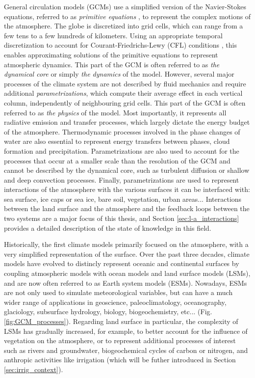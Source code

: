 General circulation models (GCMs) use a simplified version of the Navier-Stokes equations, referred to as \textit{primitive equations} \citep[initially formulated in ][]{bjerknes1910}, to represent the complex motions of the atmosphere. 
The globe is discretized into grid cells, which can range from a few tens to a few hundreds of kilometers. Using an appropriate temporal discretization to account for Courant-Friedrichs-Lewy (CFL) conditions \citep{courant_partial_1967}, this enables approximating solutions of the primitive equations to represent atmospheric dynamics. This part of the GCM is often referred to as \textit{the dynamical core} or simply \textit{the dynamics} of the model. 
However, several major processes of the climate system are not described by fluid mechanics and require additional \textit{parametrizations}, which compute their average effect in each vertical column, independently of neighbouring grid cells. 
This part of the GCM is often referred to as \textit{the physics} of the model.
Most importantly, it represents all radiative emission and transfer processes, which largely dictate the energy budget of the atmosphere.
Thermodynamic processes involved in the phase changes of water are also essential to represent energy transfers between phases, cloud formation and precipitation. Parametrizations are also used to account for the processes that occur at a smaller scale than the resolution of the GCM and cannot be described by the dynamical core, such as turbulent diffusion or shallow and deep convection processes. Finally, parametrizations are used to represent interactions of the atmosphere with the various surfaces it can be interfaced with: sea surface, ice caps or sea ice, bare soil, vegetation, urban areas... 
Interactions between the land surface and the atmosphere and the feedback loops between the two systems are a major focus of this thesis, and Section \ref{sec:l-a_interactions} provides a detailed description of the state of knowledge in this field. 

Historically, the first climate models primarily focused on the atmosphere, with
a very simplified representation of the surface. Over the past three decades, climate models have evolved to distincly represent oceanic and continental surfaces by coupling atmospheric models with ocean models and land surface models (LSMs), and are now often referred to as Earth system models (ESMs). Nowadays, ESMs are not only used to simulate meteorological variables, but can have a much wider range of applications in geoscience, paleoclimatology, oceanography, glaciology, subsurface hydrology, biology, biogeochemistry, etc... (Fig. \ref{fig:GCM_processes}).
Regarding land surface in particular, the complexity of LSMs has gradually increased, for example, to better account for the influence of vegetation on the atmosphere, or to represent additional processes of interest such as rivers and groundwater, biogeochemical cycles of carbon or nitrogen, and anthropic activities like irrigation (which will be futher introduced in Section \ref{sec:irrig_context}). 

